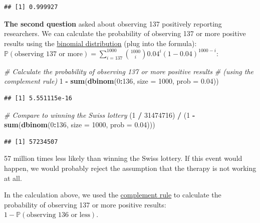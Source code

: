 \documentclass[
]{book}
\newenvironment{Shaded}{\begin{snugshade}}{\end{snugshade}}
\newcommand{\AttributeTok}[1]{\textcolor[rgb]{0.13,0.29,0.53}{#1}}
\newcommand{\CommentTok}[1]{\textcolor[rgb]{0.56,0.35,0.01}{\textit{#1}}}
\newcommand{\DecValTok}[1]{\textcolor[rgb]{0.00,0.00,0.81}{#1}}
\newcommand{\FloatTok}[1]{\textcolor[rgb]{0.00,0.00,0.81}{#1}}
\newcommand{\FunctionTok}[1]{\textcolor[rgb]{0.13,0.29,0.53}{\textbf{#1}}}
\newcommand{\NormalTok}[1]{#1}
\newcommand{\SpecialCharTok}[1]{\textcolor[rgb]{0.81,0.36,0.00}{\textbf{#1}}}
\begin{document}
\begin{verbatim}
## [1] 0.999927
\end{verbatim}

\textbf{The second question} asked about observing 137 positively reporting researchers.
We can calculate the probability of observing 137 or more positive results using the \href{https://en.wikipedia.org/wiki/Binomial_distribution}{binomial distribution}
(plug into the formula):
\(\mathbb{P}(\text{observing 137 or more}) = \sum_{i=137}^{1000} \binom{1000}{i}0.04^i (1-0.04)^{1000-i}\):

\begin{Shaded}
\begin{Highlighting}[]
\CommentTok{\# Calculate the probability of observing 137 or more positive results}
\CommentTok{\# (using the complement rule)}
\DecValTok{1} \SpecialCharTok{{-}} \FunctionTok{sum}\NormalTok{(}\FunctionTok{dbinom}\NormalTok{(}\DecValTok{0}\SpecialCharTok{:}\DecValTok{136}\NormalTok{, }\AttributeTok{size =} \DecValTok{1000}\NormalTok{, }\AttributeTok{prob =} \FloatTok{0.04}\NormalTok{))}
\end{Highlighting}
\end{Shaded}

\begin{verbatim}
## [1] 5.551115e-16
\end{verbatim}

\begin{Shaded}
\begin{Highlighting}[]
\CommentTok{\# Compare to winning the Swiss lottery}
\NormalTok{(}\DecValTok{1} \SpecialCharTok{/} \DecValTok{31474716}\NormalTok{) }\SpecialCharTok{/}\NormalTok{ (}\DecValTok{1} \SpecialCharTok{{-}} \FunctionTok{sum}\NormalTok{(}\FunctionTok{dbinom}\NormalTok{(}\DecValTok{0}\SpecialCharTok{:}\DecValTok{136}\NormalTok{, }\AttributeTok{size =} \DecValTok{1000}\NormalTok{, }\AttributeTok{prob =} \FloatTok{0.04}\NormalTok{)))}
\end{Highlighting}
\end{Shaded}

\begin{verbatim}
## [1] 57234507
\end{verbatim}

57 million times less likely than winning the Swiss lottery. If this event would happen, we would probably reject the assumption that the therapy is not working at all.

In the calculation above, we used the \href{https://en.wikipedia.org/wiki/Complement_(set_theory)}{complement rule} to calculate the probability of
observing 137 or more positive results: \(1 - \mathbb{P}(\text{observing 136 or less})\).
\end{document}
